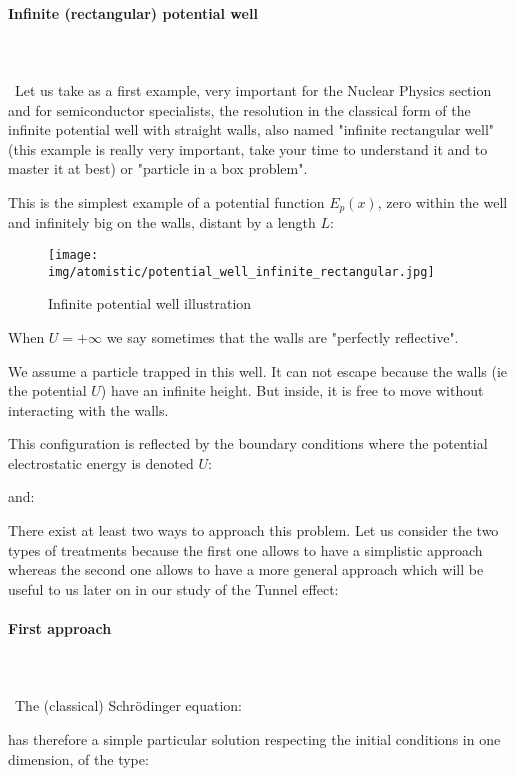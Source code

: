 	\pagebreak
	\paragraph{Infinite (rectangular) potential well}\label{quantum potential well}\mbox{}\\\\\
	Let us take as a first example, very important for the Nuclear Physics section and for semiconductor specialists, the resolution in the classical form of the infinite potential well with straight walls, also named "infinite rectangular well" (this example is really very important, take your time to understand it and to master it at best) or "particle in a box problem".

	This is the simplest example of a potential function $E_p(x)$, zero within the well and infinitely big on the walls, distant by a length $L$:
	\begin{figure}[H]
		\centering
		\texttt{[image: img/atomistic/potential\_well\_infinite\_rectangular.jpg]}	
		\caption{Infinite potential well illustration}
	\end{figure} 
	\begin{tcolorbox}[title=Remark,colframe=black,arc=10pt]
	When $U=+\infty$ we say sometimes that the walls are "perfectly reflective".
	\end{tcolorbox}
	We assume a particle trapped in this well. It can not escape because the walls (ie the potential $U$) have an infinite height. But inside, it is free to move without interacting with the walls.

	This configuration is reflected by the boundary conditions where the potential electrostatic energy is denoted $U$:
	
	and:
	
	There exist at least two ways to approach this problem. Let us consider the two types of treatments because the first one allows to have a simplistic approach whereas the second one allows to have a more general approach which will be useful to us later on in our study of the Tunnel effect:
	
	\paragraph{First approach}\mbox{}\\\\\
	The (classical) Schrödinger equation:
	
	has therefore a simple particular solution respecting the initial conditions in one dimension, of the type:
	
